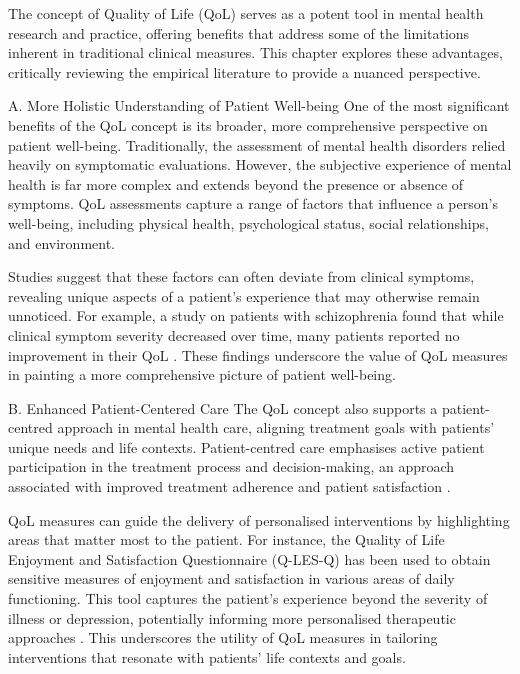 \documentclass[10pt]{article}
\begin{document}
\begin{sloppypar}
  The concept of Quality of Life (QoL) serves as a potent tool in mental health research and practice, offering benefits that address some of the limitations inherent in traditional clinical measures. This chapter explores these advantages, critically reviewing the empirical literature to provide a nuanced perspective.

  A. More Holistic Understanding of Patient Well-being
  One of the most significant benefits of the QoL concept is its broader, more comprehensive perspective on patient well-being. Traditionally, the assessment of mental health disorders relied heavily on symptomatic evaluations. However, the subjective experience of mental health is far more complex and extends beyond the presence or absence of symptoms. QoL assessments capture a range of factors that influence a person's well-being, including physical health, psychological status, social relationships, and environment.

  Studies suggest that these factors can often deviate from clinical symptoms, revealing unique aspects of a patient's experience that may otherwise remain unnoticed. For example, a study on patients with schizophrenia found that while clinical symptom severity decreased over time, many patients reported no improvement in their QoL \citep{eack_quality_2007}. These findings underscore the value of QoL measures in painting a more comprehensive picture of patient well-being.

  B. Enhanced Patient-Centered Care
  The QoL concept also supports a patient-centred approach in mental health care, aligning treatment goals with patients' unique needs and life contexts. Patient-centred care emphasises active patient participation in the treatment process and decision-making, an approach associated with improved treatment adherence and patient satisfaction \citep{dwamena_interventions_2012}.

  QoL measures can guide the delivery of personalised interventions by highlighting areas that matter most to the patient. For instance, the Quality of Life Enjoyment and Satisfaction Questionnaire (Q-LES-Q) has been used to obtain sensitive measures of enjoyment and satisfaction in various areas of daily functioning. This tool captures the patient's experience beyond the severity of illness or depression, potentially informing more personalised therapeutic approaches \citep{endicott_quality_1993}. This underscores the utility of QoL measures in tailoring interventions that resonate with patients' life contexts and goals.


\end{sloppypar}
\end{document}

